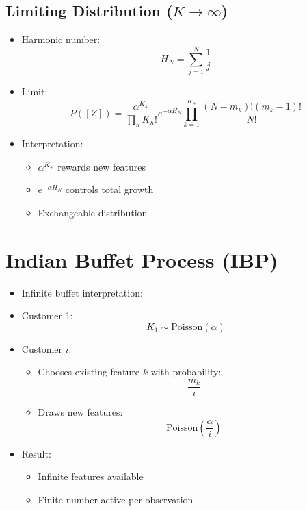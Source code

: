 \documentclass[12pt,oneside]{book}
\numberwithin{equation}{section}
\theoremstyle{definition}
\theoremstyle{plain}
\theoremstyle{remark}
\begin{document}
\subsection*{Limiting Distribution ($K \to \infty$)}

\begin{itemize}
\item Harmonic number:
\[
H_N = \sum_{j=1}^N \frac{1}{j}
\]

\item Limit:
\[
P([Z])
=
\frac{\alpha^{K_+}}{\prod_h K_h!}
e^{-\alpha H_N}
\prod_{k=1}^{K_+}
\frac{(N-m_k)!(m_k-1)!}{N!}
\]

\item Interpretation:
\begin{itemize}
\item $\alpha^{K_+}$ rewards new features
\item $e^{-\alpha H_N}$ controls total growth
\item Exchangeable distribution
\end{itemize}
\end{itemize}

\section{Indian Buffet Process (IBP)}

\begin{itemize}
\item Infinite buffet interpretation:

\item Customer 1:
\[
K_1 \sim \text{Poisson}(\alpha)
\]

\item Customer $i$:
\begin{itemize}
\item Chooses existing feature $k$ with probability:
\[
\frac{m_k}{i}
\]

\item Draws new features:
\[
\text{Poisson}\left(\frac{\alpha}{i}\right)
\]
\end{itemize}

\item Result:
\begin{itemize}
\item Infinite features available
\item Finite number active per observation
\end{itemize}
\end{itemize}
\end{document}
